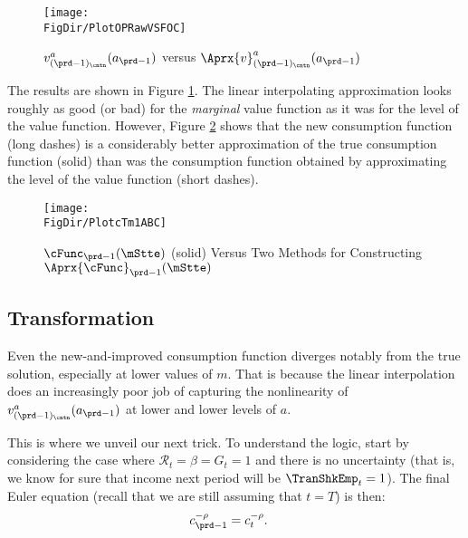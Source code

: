 \documentclass[titlepage, headings=optiontotocandhead]{Resources/texmf-local/tex/latex/econtex}
\begin{document}
\hypertarget{PlotOPRawVSFOC}{}
\begin{figure}
  \centerline{\texttt{[image: \\FigDir/PlotOPRawVSFOC]}}
  \caption{$v_{({\prd-1})_\cntn}^{a}(a_{\prd-1})$ versus $\Aprx{v}_{({\prd-1})_\cntn}^{a}(a_{\prd-1})$}
  \label{fig:PlotOPRawVSFOC}
\end{figure}



The results are shown in Figure \ref{fig:PlotOPRawVSFOC}.  The linear interpolating approximation looks roughly as good (or bad) for the \textit{marginal} value function as it was for the level of the value function. However, Figure \ref{fig:PlotcTm1ABC} shows that the new consumption function (long dashes) is a considerably better approximation of the true consumption function (solid) than was the consumption function obtained by approximating the level of the value function (short dashes).

\hypertarget{PlotcTm1ABC}{}
\begin{figure}
  \centerline{\texttt{[image: \\FigDir/PlotcTm1ABC]}}
  \caption{$\cFunc_{\prd-1}(\mStte)$ (solid) Versus Two Methods for Constructing $\Aprx{\cFunc}_{\prd-1}(\mStte)$}
  \label{fig:PlotcTm1ABC}
\end{figure}

\hypertarget{transformation}{}
\subsection{Transformation}\label{subsec:transformation}

Even the new-and-improved consumption function diverges notably from the true
solution, especially at lower values of $m$.  That is because the
linear interpolation does an increasingly poor job of capturing the
nonlinearity of $v_{({\prd-1})_\cntn}^{a}(a_{\prd-1})$ at
lower and lower levels of $a$.

This is where we unveil our next trick.  To understand the logic,
start by considering the case where $\mathcal{R}_{t} = \beta =
G_{t} = 1$ and there is no uncertainty
 (that is, we know for sure that income next period
will be $\TranShkEmp_{t} = 1$).  The final Euler equation (recall that we are still assuming that $t=T$) is then:
\begin{equation}\begin{gathered}\begin{aligned}
      c_{\prd-1}^{-\rho}  & = c_{t}^{-\rho}.
    \end{aligned}\end{gathered}\end{equation}
\end{document}
